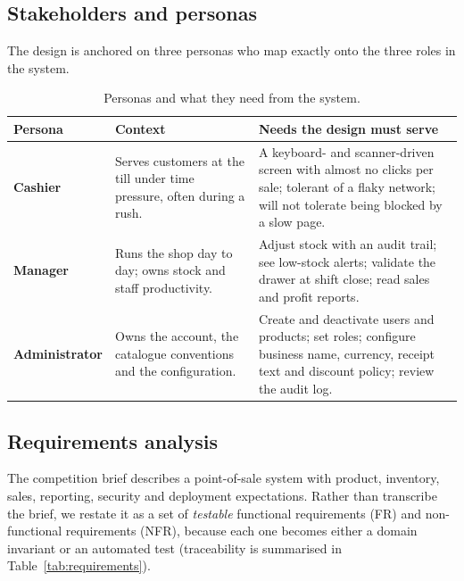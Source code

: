\documentclass[11pt,a4paper]{article}
\begin{document}
\subsection{Stakeholders and personas}

The design is anchored on three personas who map exactly onto the three roles in the system.

\begin{table}[htbp]\centering
\small
\caption{Personas and what they need from the system.}
\begin{tabular}{@{}p{}p{}p{}@{}}
\toprule
\textbf{Persona} & \textbf{Context} & \textbf{Needs the design must serve} \\
\midrule
\textbf{Cashier} & Serves customers at the till under time pressure, often during a rush. &
A keyboard- and scanner-driven screen with almost no clicks per sale; tolerant of a flaky
network; will not tolerate being blocked by a slow page. \\
\textbf{Manager} & Runs the shop day to day; owns stock and staff productivity. &
Adjust stock with an audit trail; see low-stock alerts; validate the drawer at shift close;
read sales and profit reports. \\
\textbf{Administrator} & Owns the account, the catalogue conventions and the configuration. &
Create and deactivate users and products; set roles; configure business name, currency,
receipt text and discount policy; review the audit log. \\
\bottomrule
\end{tabular}
\end{table}

\subsection{Requirements analysis}
\label{sec:requirements}

The competition brief describes a point-of-sale system with product, inventory, sales, reporting,
security and deployment expectations. Rather than transcribe the brief, we restate it as a set of
\emph{testable} functional requirements (FR) and non-functional requirements (NFR), because each one
becomes either a domain invariant or an automated test (traceability is summarised in
Table~\ref{tab:requirements}).
\end{document}
